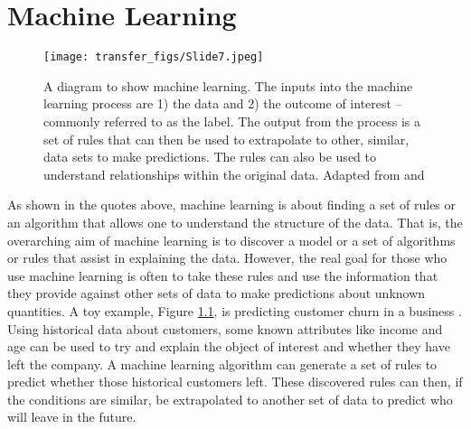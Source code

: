
\chapter{Machine Learning}

\begin{figure}
  \texttt{[image: transfer\_figs/Slide7.jpeg]}
  \caption[Machine learning diagram.]{A diagram to show machine learning. The inputs into the machine learning process are 1) the data and 2) the outcome of interest – commonly referred to as the label. The output from the process is a set of rules that can then be used to extrapolate to other, similar, data sets to make predictions. The rules can also be used to understand relationships within the original data.  Adapted from  \textcite{chollet_allaire_2018} and \textcite{provost2013data} }
  \label{fig:ML}
\end{figure}


 \parencite{spiegelhalter2019art}

 \parencite{chollet_allaire_2018}


As shown in the quotes above, machine learning is about finding a set of rules or an algorithm that allows one to understand the structure of the data. That is, the overarching aim of machine learning is to discover a model or a set of algorithms or rules that assist in explaining the data. However, the real goal for those who use machine learning is often to take these rules and use the information that they provide against other sets of data to make predictions about unknown quantities. A toy example, Figure \ref{fig:ML},  is predicting customer churn in a business \parencite{provost2013data}. Using historical data about customers, some known attributes like income and age can be used to try and explain the object of interest and whether they have left the company. A machine learning algorithm can generate a set of rules to predict whether those historical customers left. These discovered rules can then, if the conditions are similar, be extrapolated to another set of data to predict who will leave in the future.


